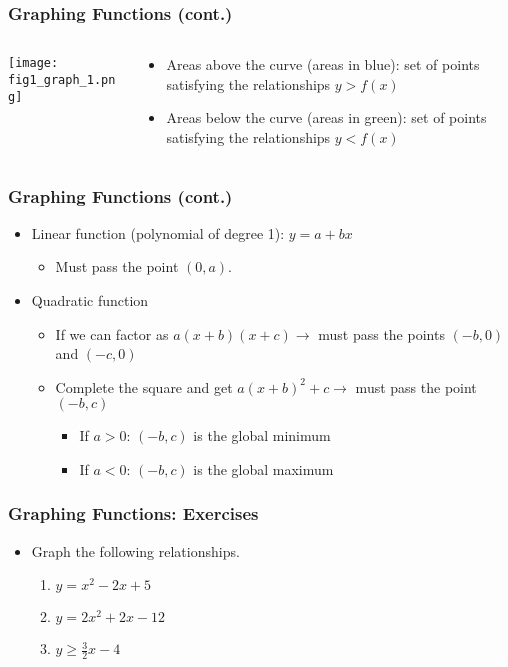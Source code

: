 \documentclass[pdflatex, 12pt]{beamer}
\begin{document}
\begin{frame}
\frametitle{Graphing Functions (cont.)}
\begin{columns}
\begin{column}{0.5\textwidth}
\texttt{[image: fig1\_graph\_1.png]}
\end{column}
\begin{column}{0.5\textwidth}
\begin{itemize}
\item Areas above the curve (areas in blue): set of points satisfying the relationships $y > f(x)$ 
\vspace{0.4cm}
\item Areas below the curve (areas in green): set of points satisfying the relationships $y < f(x)$ 
\end{itemize}
\end{column}
\end{columns}
\end{frame}

\begin{frame}
\frametitle{Graphing Functions (cont.)}
\begin{itemize}
\item Linear function (polynomial of degree 1): $y = a + bx$
 \begin{itemize}
 \item Must pass the point $(0, a)$. 
 \end{itemize}
\vspace{0.4cm}
\item Quadratic function
 \begin{itemize}
 \item If we can factor as $a(x + b)(x + c) \rightarrow$ must pass the points $(-b, 0)$ and $(-c, 0)$
 \item Complete the square and get $a(x + b)^2 + c \rightarrow$ must pass the point $(-b, c)$
  \begin{itemize}
  \item If $a > 0$: $(-b, c)$ is the global minimum
  \item If $a < 0$: $(-b, c)$ is the global maximum
  \end{itemize}
 \end{itemize}
\end{itemize}
\end{frame}

\begin{frame}
\frametitle{Graphing Functions: Exercises}
\begin{itemize}
\item Graph the following relationships.
 \begin{enumerate}
 \item $y = x^2 - 2x + 5$
 \item $y = 2x^2 + 2x - 12$
 \item $y \geq \frac{3}{2}x - 4$
 \end{enumerate}
\end{itemize}
\end{frame}
\end{document}
